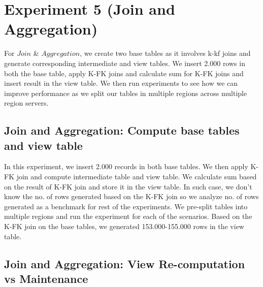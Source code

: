 \documentclass[11pt,a4paper,bibtotoc,idxtotoc,headsepline,footsepline,footexclude,BCOR12mm,DIV13]{scrbook}
\begin{document}
\section{Experiment 5 (Join and Aggregation)}
\label{(sec:Join and Aggregation Dist)} 
For $Join$ \& $Aggregation$, we create two base tables as it involves k-kf joins and generate corresponding intermediate and view tables. We insert 2.000 rows in both the base table, apply K-FK joins and calculate sum for K-FK joins and insert result in the view table. We then run experiments to see how we can improve performance as we split our tables in multiple regions across multiple region servers.

\subsection{Join and Aggregation: Compute base tables and view table}
\label{Join and Aggregation: Compute base tables and view table}
In this experiment, we insert 2.000 records in both base tables. We then apply K-FK join and compute intermediate table and view table. We calculate sum based on the result of K-FK join and store it in the view table. In such case, we don't know the no. of rows generated based on the K-FK join so we analyze no. of rows generated as a benchmark for rest of the experiments. We pre-split tables into multiple regions and run the experiment for each of the scenarios. Based on the K-FK join on the base tables, we generated 153.000-155.000 rows in the view table.


\subsection{Join and Aggregation: View Re-computation vs Maintenance}
\label{Join and Aggregation: View Re-computation vs Maintenance Distributed}
\end{document}

